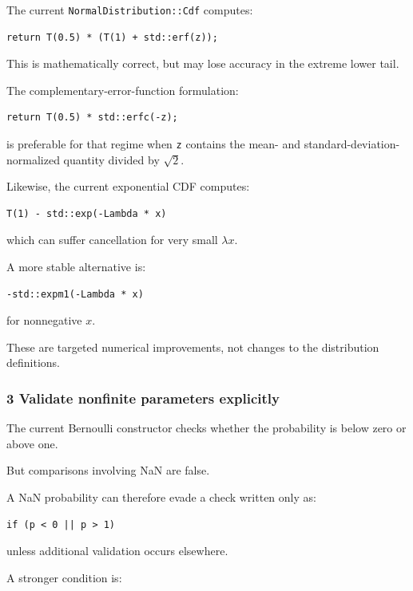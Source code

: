 The current \texttt{NormalDistribution::Cdf} computes:

\begin{verbatim}
return T(0.5) * (T(1) + std::erf(z));
\end{verbatim}

This is mathematically correct, but may lose accuracy in the extreme lower tail.

The complementary-error-function formulation:

\begin{verbatim}
return T(0.5) * std::erfc(-z);
\end{verbatim}

is preferable for that regime when \texttt{z} contains the mean- and standard-deviation-normalized quantity divided by \(\sqrt2\).

Likewise, the current exponential CDF computes:

\begin{verbatim}
T(1) - std::exp(-Lambda * x)
\end{verbatim}

which can suffer cancellation for very small \(\lambda x\).

A more stable alternative is:

\begin{verbatim}
-std::expm1(-Lambda * x)
\end{verbatim}

for nonnegative \(x\).

These are targeted numerical improvements, not changes to the distribution definitions.

\subsubsection{3 Validate nonfinite parameters explicitly}\label{02-foundations-ii-ch039-validate-nonfinite-parameters-explicitly}

The current Bernoulli constructor checks whether the probability is below zero or above one.

But comparisons involving NaN are false.

A NaN probability can therefore evade a check written only as:

\begin{verbatim}
if (p < 0 || p > 1)
\end{verbatim}

unless additional validation occurs elsewhere.

A stronger condition is:

